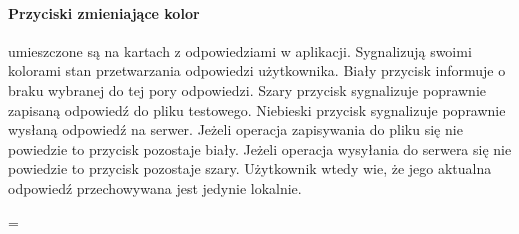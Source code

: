 \documentclass[archivemod, eng]{mgr}
\newenvironment{absolutelynopagebreak}
{\par\nobreak\vfil\penalty0\vfilneg
	\vtop\bgroup}
{\par\xdef\tpd{\the\prevdepth}\egroup
	\prevdepth=\tpd}
\begin{document}
				\begin{absolutelynopagebreak}
				\paragraph{Przyciski zmieniające kolor}
				umieszczone są na kartach z odpowiedziami w aplikacji. Sygnalizują swoimi kolorami stan przetwarzania odpowiedzi użytkownika. Biały przycisk informuje o braku wybranej do tej pory odpowiedzi. Szary przycisk sygnalizuje poprawnie zapisaną odpowiedź do pliku testowego. Niebieski przycisk sygnalizuje poprawnie wysłaną odpowiedź na serwer.
				Jeżeli operacja zapisywania do pliku się nie powiedzie to przycisk pozostaje biały.
				Jeżeli operacja wysyłania do serwera się nie powiedzie to przycisk pozostaje szary. Użytkownik wtedy wie, że jego aktualna odpowiedź przechowywana jest jedynie lokalnie.\\
				\end{absolutelynopagebreak}
				
\end{document}
